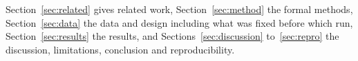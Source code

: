 Section~\ref{sec:related} gives related work, Section~\ref{sec:method} the formal methods, Section~\ref{sec:data} the data and design including what was fixed before which run, Section~\ref{sec:results} the results, and Sections~\ref{sec:discussion} to~\ref{sec:repro} the discussion, limitations, conclusion and reproducibility.
